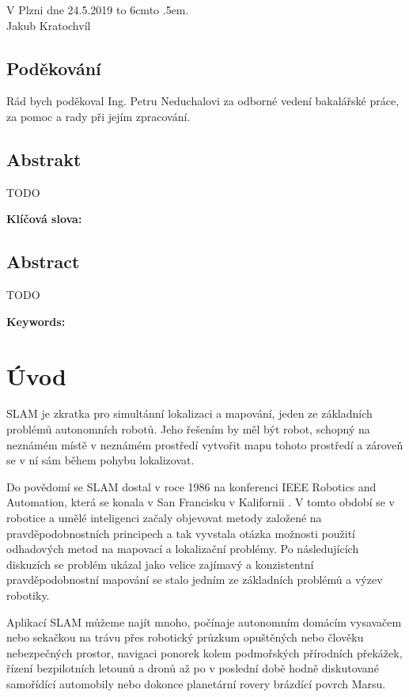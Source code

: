 \documentclass[12pt,a4paper]{article}
\def\dotfill#1{\cleaders\hbox to #1{.}\hfill}
\newcommand\dotline[2][.5em]{\leavevmode\hbox to #2{\dotfill{#1}\hfil}}
\begin{document}
\vspace{2cm}
\noindent
V Plzni dne 24.5.2019 \hfill \dotline{6cm} \\

\hspace*{10.7cm} Jakub Kratochvíl

\vspace{6cm}

\subsection*{Poděkování}

Rád bych poděkoval Ing. Petru Neduchalovi za odborné vedení bakalářské práce, za pomoc a rady při jejím zpracování.

\newpage
\subsection*{Abstrakt}
TODO

\textbf{Klíčová slova:} 

\subsection*{Abstract}
TODO

\textbf{Keywords:}

\newpage
\tableofcontents
\newpage
\fontsize{12pt}{18pt}\selectfont


\section{Úvod}
SLAM je zkratka pro simultánní lokalizaci a mapování, jeden ze základních problémů autonomních robotů. Jeho řešením by měl být robot, schopný na neznámém místě v neznámém prostředí vytvořit mapu tohoto prostředí a zároveň se v ní sám během pohybu lokalizovat.

Do povědomí se SLAM dostal v roce 1986 na konferenci IEEE Robotics and Automation, která se konala v San Francisku v Kalifornii \cite{Durrant-Whyte}. V tomto období se v robotice a umělé inteligenci začaly objevovat metody založené na pravděpodobnostních principech a tak vyvstala otázka možnosti použití odhadových metod na mapovací a lokalizační problémy. Po následujících diskuzích se problém ukázal jako velice zajímavý a konzistentní pravděpodobnostní mapování se stalo jedním ze základních problémů a výzev robotiky.

Aplikací SLAM můžeme najít mnoho, počínaje autonomním domácím vysavačem nebo sekačkou na trávu přes robotický průzkum opuštěných nebo člověku nebezpečných prostor, navigaci ponorek kolem podmořských přírodních překážek, řízení bezpilotních letounů a dronů až po v poslední době hodně diskutované samořídící automobily nebo dokonce planetární rovery brázdící povrch Marsu.
\end{document}

